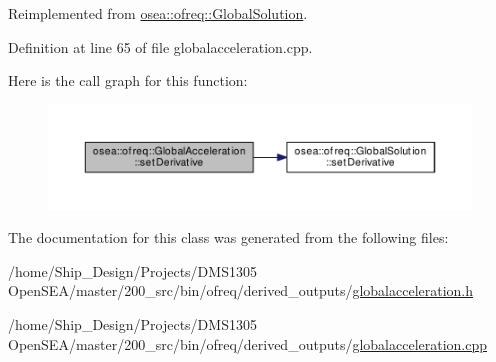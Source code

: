 Reimplemented from \hyperlink{classosea_1_1ofreq_1_1_global_solution_a537163391f1f55d073720b20f69acfa5}{osea\-::ofreq\-::\-Global\-Solution}.



Definition at line 65 of file globalacceleration.\-cpp.



Here is the call graph for this function\-:
\nopagebreak
\begin{figure}[H]
\begin{center}
\leavevmode
\includegraphics[width=350pt]{classosea_1_1ofreq_1_1_global_acceleration_a14a041ea42d4c1bc10211c9a44aa3431_cgraph}
\end{center}
\end{figure}




The documentation for this class was generated from the following files\-:\begin{DoxyCompactItemize}
\item 
/home/\-Ship\-\_\-\-Design/\-Projects/\-D\-M\-S1305 Open\-S\-E\-A/master/200\-\_\-src/bin/ofreq/derived\-\_\-outputs/\hyperlink{globalacceleration_8h}{globalacceleration.\-h}\item 
/home/\-Ship\-\_\-\-Design/\-Projects/\-D\-M\-S1305 Open\-S\-E\-A/master/200\-\_\-src/bin/ofreq/derived\-\_\-outputs/\hyperlink{globalacceleration_8cpp}{globalacceleration.\-cpp}\end{DoxyCompactItemize}
